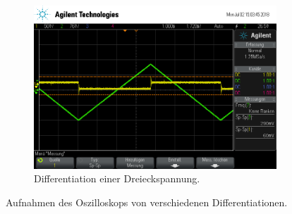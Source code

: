 \begin{figure}[ht]
\begin{subfigure}[]{\textwidth}
  \end{subfigure}
  \begin{subfigure}[]{\textwidth}
    \centering
    \includegraphics[height=0.3\textheight]{data/scope_267.png}
    \caption{Differentiation einer Dreieckspannung.}
    \label{subfig:dif_dreieck}
  \end{subfigure}
  \caption{Aufnahmen des Oszilloskops von verschiedenen Differentiationen.}
  \label{fig:differentiationen}
\end{figure}
